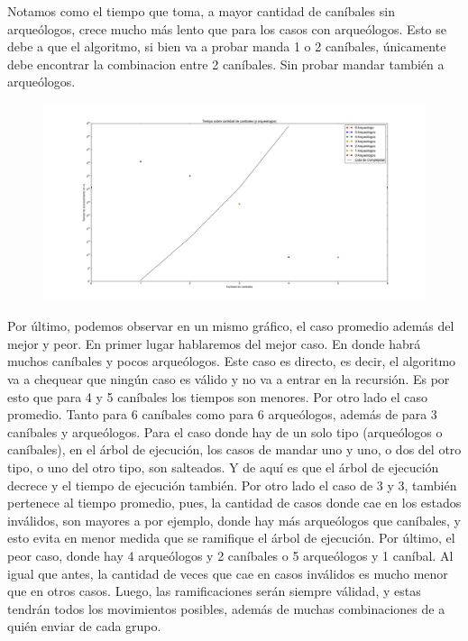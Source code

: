   Notamos como el tiempo que toma, a mayor cantidad de caníbales sin arqueólogos, crece mucho más lento que para los casos con arqueólogos. Esto se debe a que el algoritmo, si bien va a probar manda 1 o 2 caníbales, únicamente debe encontrar la combinacion entre 2 caníbales. Sin probar mandar también a arqueólogos.


  \begin{figure}[H]
    \begin{center}
      \includegraphics[width=1.1\columnwidth]{imagenes/ej1exp3NuevaVersion.jpeg}
      \caption{}
    \end{center}
  \end{figure}


  Por último, podemos observar en un mismo gráfico, el caso promedio además del mejor y peor. En primer lugar hablaremos del mejor caso. En donde habrá muchos caníbales y pocos arqueólogos. Este caso es directo, es decir, el algoritmo va a chequear que ningún caso es válido y no va a entrar en la recursión. Es por esto que para 4 y 5 caníbales los tiempos son menores. Por otro lado el caso promedio. Tanto para 6 caníbales como para 6 arqueólogos, además de para 3 caníbales y arqueólogos. Para el caso donde hay de un solo tipo (arqueólogos o caníbales), en el árbol de ejecución, los casos de mandar uno y uno, o dos del otro tipo, o uno del otro tipo, son salteados. Y de aquí es que el árbol de ejecución decrece y el tiempo de ejecución también. Por otro lado el caso de 3 y 3,  también pertenece al tiempo promedio, pues, la cantidad de casos donde cae en los estados inválidos, son mayores a por ejemplo, donde hay más arqueólogos que caníbales, y esto evita en menor medida que se ramifique el árbol de ejecución. Por último, el peor caso, donde hay 4 arqueólogos y 2 caníbales o 5 arqueólogos y 1 caníbal. Al igual que antes, la cantidad de veces que cae en casos inválidos es mucho menor que en otros casos. Luego, las ramificaciones serán siempre válidad, y estas tendrán todos los movimientos posibles, además de muchas combinaciones de a quién enviar de cada grupo.